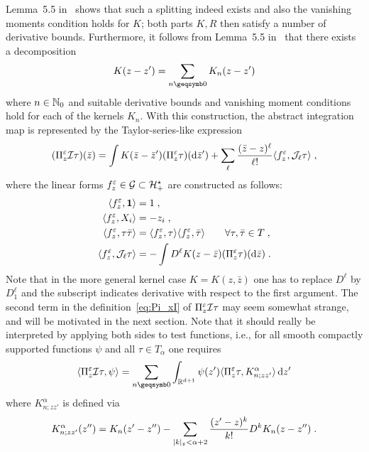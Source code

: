 \documentclass[reqno,11pt]{article}
\def\unit{\vone}
\def\abss#1{\abs{#1}_\mathfrak{s}}
\begin{document}
Lemma~5.5 in~\cite{Hairer2014} shows that such a splitting indeed exists and 
also the vanishing moments condition holds for $K$; both parts $K,R$ then
satisfy a number of derivative bounds. Furthermore, it follows from Lemma~5.5
in~\cite{Hairer2014} that there exists a decomposition
\begin{equation}
\label{eq:Kdecomp}
K(z-z')=\sum_{n\geqs 0} K_n(z-z')
\end{equation}
where $n\in\mathbb{N}_0$ and suitable derivative bounds and vanishing moment conditions hold for 
each of the kernels $K_n$. With this construction, the abstract integration 
map is represented by the Taylor-series-like expression
\begin{equation}
 \label{eq:Pi_xI} 
(\Pi^\eps_z \cI\tau)(\bar z) = \int K(\bar z-\bar z')(\Pi^\eps_z \tau)(\6\bar
z') 
+ \sum_\ell \frac{(\bar z-z)^\ell}{\ell!} \pscal{f^\eps_z}{\cJ_\ell\tau}\;,
\end{equation} 
where the linear forms $f^\varepsilon_z\in \mathcal{G}\subset{\mathcal H}_+^\star$
are constructed as follows:
\begin{align}
\nonumber
\pscal{f^\eps_z}{\unit} &= 1\;, \\
\nonumber
\pscal{f^\eps_z}{X_i} &= -z_i\;, \\
\pscal{f^\eps_z}{\tau\bar\tau} &= \pscal{f^\eps_z}{\tau}
\pscal{f^\eps_z}{\bar\tau} 
\nonumber
\qquad \forall\tau,\bar\tau\in T\;, \\
\pscal{f^\eps_z}{\cJ_\ell\tau} &= - \int D^\ell K(z-\bar z)
(\Pi^\eps_z\tau)(\6\bar
z)\;.
\label{eq:f_x} 
\end{align}
Note that in the more general kernel case $K=K(z,\bar z)$ one has to replace
$D^\ell$ by $D^\ell_1$ and the subscript indicates derivative with respect to
the first argument. The second term in the definition~\eqref{eq:Pi_xI} of
$\Pi^\varepsilon_z {\mathcal I}\tau$ may seem somewhat strange, and will be motivated in the
next section. Note that it should really be interpreted by applying both sides
to test functions, i.e., for all smooth compactly supported functions $\psi$ and
all $\tau \in T_\alpha$ one requires
\begin{equation}
\pscal{\Pi^\eps_z \cI\tau}{\psi} =\sum_{n\geqs 0}\int_{\R^{d+1}}\psi(z') 
\pscal{\Pi^\eps_z \tau}{K_{n;zz'}^\alpha}\6 z'  
\end{equation}
where $K_{n;zz'}^\alpha$ is defined via
\begin{equation}
K_{n;zz'}^\alpha(z'')=K_n(z'-z'')-\sum_{\abss{k}<\alpha+2}
\frac{(z'-z)^k}{k!}D^k K_n(z-z'')\;.
\end{equation}
\end{document}
